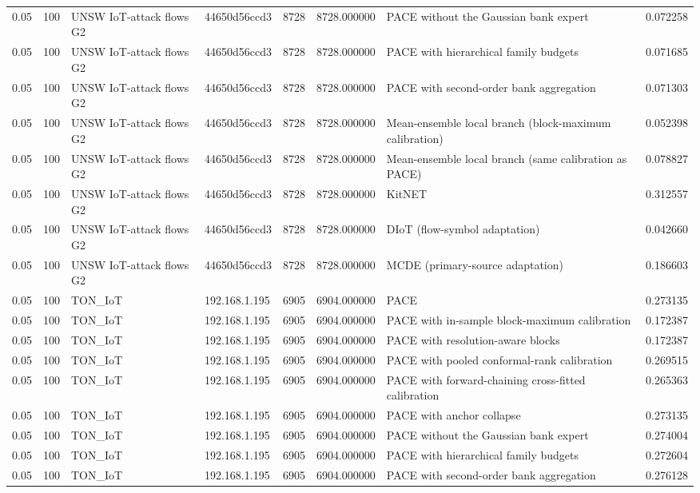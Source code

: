 \begin{tabular}{llllllll}
0.05 & 100 & UNSW IoT-attack flows G2 & 44650d56ccd3 & 8728 & 8728.000000 & PACE without the Gaussian bank expert & 0.072258 \\
0.05 & 100 & UNSW IoT-attack flows G2 & 44650d56ccd3 & 8728 & 8728.000000 & PACE with hierarchical family budgets & 0.071685 \\
0.05 & 100 & UNSW IoT-attack flows G2 & 44650d56ccd3 & 8728 & 8728.000000 & PACE with second-order bank aggregation & 0.071303 \\
0.05 & 100 & UNSW IoT-attack flows G2 & 44650d56ccd3 & 8728 & 8728.000000 & Mean-ensemble local branch (block-maximum calibration) & 0.052398 \\
0.05 & 100 & UNSW IoT-attack flows G2 & 44650d56ccd3 & 8728 & 8728.000000 & Mean-ensemble local branch (same calibration as PACE) & 0.078827 \\
0.05 & 100 & UNSW IoT-attack flows G2 & 44650d56ccd3 & 8728 & 8728.000000 & KitNET & 0.312557 \\
0.05 & 100 & UNSW IoT-attack flows G2 & 44650d56ccd3 & 8728 & 8728.000000 & DIoT (flow-symbol adaptation) & 0.042660 \\
0.05 & 100 & UNSW IoT-attack flows G2 & 44650d56ccd3 & 8728 & 8728.000000 & MCDE (primary-source adaptation) & 0.186603 \\
0.05 & 100 & TON\_IoT & 192.168.1.195 & 6905 & 6904.000000 & PACE & 0.273135 \\
0.05 & 100 & TON\_IoT & 192.168.1.195 & 6905 & 6904.000000 & PACE with in-sample block-maximum calibration & 0.172387 \\
0.05 & 100 & TON\_IoT & 192.168.1.195 & 6905 & 6904.000000 & PACE with resolution-aware blocks & 0.172387 \\
0.05 & 100 & TON\_IoT & 192.168.1.195 & 6905 & 6904.000000 & PACE with pooled conformal-rank calibration & 0.269515 \\
0.05 & 100 & TON\_IoT & 192.168.1.195 & 6905 & 6904.000000 & PACE with forward-chaining cross-fitted calibration & 0.265363 \\
0.05 & 100 & TON\_IoT & 192.168.1.195 & 6905 & 6904.000000 & PACE with anchor collapse & 0.273135 \\
0.05 & 100 & TON\_IoT & 192.168.1.195 & 6905 & 6904.000000 & PACE without the Gaussian bank expert & 0.274004 \\
0.05 & 100 & TON\_IoT & 192.168.1.195 & 6905 & 6904.000000 & PACE with hierarchical family budgets & 0.272604 \\
0.05 & 100 & TON\_IoT & 192.168.1.195 & 6905 & 6904.000000 & PACE with second-order bank aggregation & 0.276128 \\

\end{tabular}
